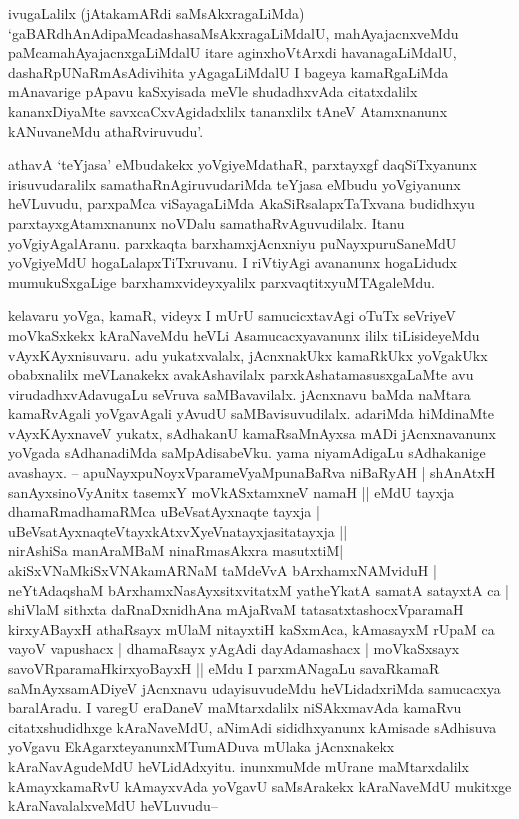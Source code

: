 \begin{artha}
ivugaLalilx (jAtakamARdi saMsAkxragaLiMda) `gaBARdhAnAdipaMcadashasaMsAkxragaLiMdalU, mahAyajacnxveMdu paMcamahAyajacnxgaLiMdalU itare aginxhoVtArxdi havanagaLiMdalU, dashaRpUNaRmAsAdivihita yAgagaLiMdalU I bageya kamaRgaLiMda mAnavarige pApavu kaSxyisada meVle shudadhxvAda citatxdalilx kananxDiyaMte savxcaCxvAgidadxlilx tananxlilx tAneV Atamxnanunx kANuvaneMdu athaRviruvudu'. 

athavA `teYjasa' eMbudakekx yoVgiyeMdathaR, parxtayxgf daqSiTxyanunx irisuvudaralilx samathaRnAgiruvudariMda teYjasa eMbudu yoVgiyanunx heVLuvudu, parxpaMca viSayagaLiMda AkaSiRsalapxTaTxvana budidhxyu parxtayxgAtamxnanunx noVDalu samathaRvAguvudilalx. Itanu yoVgiyAgalAranu. parxkaqta barxhamxjAcnxniyu puNayxpuruSaneMdU yoVgiyeMdU hogaLalapxTiTxruvanu. I riVtiyAgi avananunx hogaLidudx mumukuSxgaLige barxhamxvideyxyalilx parxvaqtitxyuMTAgaleMdu. 

kelavaru yoVga, kamaR, videyx I mUrU samucicxtavAgi oTuTx seVriyeV moVkaSxkekx kAraNaveMdu heVLi Asamucacxyavanunx ililx tiLisideyeMdu vAyxKAyxnisuvaru. adu yukatxvalalx, jAcnxnakUkx kamaRkUkx yoVgakUkx obabxnalilx meVLanakekx avakAshavilalx parxkAshatamasusxgaLaMte avu virudadhxvAdavugaLu seVruva saMBavavilalx. jAcnxnavu baMda naMtara kamaRvAgali yoVgavAgali yAvudU saMBavisuvudilalx. adariMda hiMdinaMte vAyxKAyxnaveV yukatx, sAdhakanU kamaRsaMnAyxsa mADi jAcnxnavanunx yoVgada sAdhanadiMda saMpAdisabeVku. yama niyamAdigaLu sAdhakanige avashayx. -- apuNayxpuNoyxVparameVyaMpunaBaRva niBaRyAH | shAnAtxH sanAyxsinoVyAnitx tasemxY moVkASxtamxneV namaH || eMdU tayxja dhamaRmadhamaRMca uBeVsatAyxnaqte tayxja |\\
uBeVsatAyxnaqteVtayxkAtxvXyeVnatayxjasitatayxja ||\\
nirAshiSa manAraMBaM ninaRmasAkxra masutxtiM|\\
akiSxVNaMkiSxVNAkamARNaM taMdeVvA bArxhamxNAMviduH |\\
neYtAdaqshaM bArxhamxNasAyxsitxvitatxM yatheYkatA samatA satayxtA ca | shiVlaM sithxta daRnaDxnidhAna mAjaRvaM tatasatxtashocxVparamaH kirxyABayxH athaRsayx mUlaM nitayxtiH kaSxmAca, kAmasayxM rUpaM ca vayoV vapushacx | dhamaRsayx yAgAdi dayAdamashacx | moVkaSxsayx savoVRparamaHkirxyoBayxH || eMdu I parxmANagaLu savaRkamaR saMnAyxsamADiyeV jAcnxnavu udayisuvudeMdu heVLidadxriMda samucacxya baralAradu. I varegU eraDaneV maMtarxdalilx niSAkxmavAda kamaRvu citatxshudidhxge kAraNaveMdU, aNimAdi sididhxyanunx kAmisade sAdhisuva yoVgavu EkAgarxteyanunxMTumADuva mUlaka jAcnxnakekx kAraNavAgudeMdU heVLidAdxyitu. inunxmuMde mUrane maMtarxdalilx kAmayxkamaRvU kAmayxvAda yoVgavU saMsArakekx kAraNaveMdU mukitxge kAraNavalalxveMdU heVLuvudu--
\end{artha}

